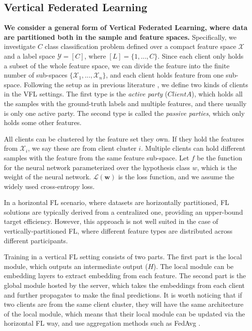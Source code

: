\documentclass[withindex,glossary]{cam-thesis}
\begin{document}
\subsection{Vertical Federated Learning} \label{sec:problem_setup}
\textbf{We consider a general form of Vertical Federated Learning, where data are partitioned both in the sample and feature spaces.}
Specifically, we investigate $C$ class classification problem defined over a compact feature space $\mathcal{X}$ and a label space $\mathcal{Y} = [C]$, where $[L] = \{ 1,...,C \}$. Since each client only holds a subset of the whole feature space, we can divide the feature into the finite number of sub-spaces $\{\mathcal{X}_1,...,\mathcal{X}_n \}$, and each client holds feature from one sub-space. Following the setup as in previous literature \citep{vfl}, we define two kinds of clients in the VFL settings. The first type is the \emph{active party} ($Client A$), which holds all the samples with the ground-truth labels and multiple features, and there usually is only one active party. The second type is called the \emph{passive parties}, which only holds some other features.  

All clients can be clustered by the feature set they own. If they hold the features from $\mathcal{X}_i$, we say these are from client cluster $i$. Multiple clients can hold different samples with the feature from the same feature sub-space. 
Let $f$ be the function for the neural network parameterized over the hypothesis class $w$, which is the weight of the neural network. $\mathcal{L}(\textbf{w})$ is the loss function, and we assume the widely used cross-entropy loss.

In a horizontal FL scenario, where datasets are horizontally partitioned, FL solutions are typically derived from a centralized one, providing an upper-bound target efficiency. However, this approach is not well suited in the case of vertically-partitioned FL, where different feature types are distributed across different participants.

Training in a vertical FL setting consists of two parts. The first part is the local module, which outputs an intermediate output ($H$). The local module can be embedding layers to extract embedding from each feature. The second part is the global module hosted by the server, which takes the embeddings from each client and further propagates to make the final predictions. It is worth noticing that if two clients are from the same client cluster, they will have the same architecture of the local module, which means that their local module can be updated via the horizontal FL way, and use aggregation methods such as FedAvg \citep{fedavg}. 
\end{document}
